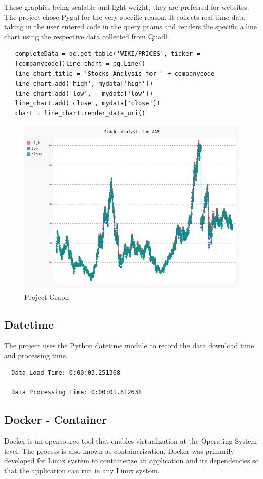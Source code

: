 These graphics being scalable and light weight, they are preferred for
websites. The project chose Pygal for the very specific reason. It collects
real-time data taking in the user entered code in the query prams and renders
the specific a line chart using the respective data collected from Quadl.
\begin{verbatim}
   completeData = qd.get_table('WIKI/PRICES', ticker =
   [companycode])line_chart = pg.Line()
   line_chart.title = 'Stocks Analysis for ' + companycode
   line_chart.add('high', mydata['high'])
   line_chart.add('low',   mydata['low'])
   line_chart.add('close', mydata['close'])
   chart = line_chart.render_data_uri()
\end{verbatim}
\begin{figure}[htb]
	\centering\includegraphics[width=\columnwidth]{images/hid_417_project_graph.png}
  \caption{Project Graph}
  \label{fig:project_graph}
\end{figure}
\subsection{Datetime}

The project uses the Python datetime module to record the data download time
and processing time.
\begin{verbatim}
  Data Load Time: 0:00:03.251368

  Data Processing Time: 0:00:01.612638
\end{verbatim}

\subsection{Docker - Container}
Docker is an opensource tool that enables virtualization at the Operating
System level. The process is also known as containerization. Docker was
primarily developed for Linux system to containerize an application and its
dependencies so that the application can run in any Linux system.

